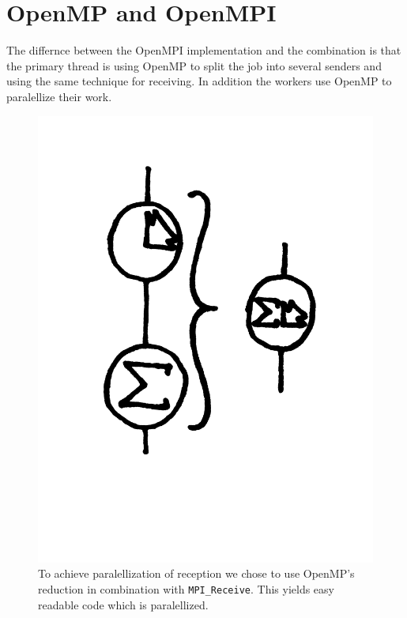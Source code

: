 \section{OpenMP and OpenMPI }
The differnce between the OpenMPI implementation and the combination is that the primary thread is using OpenMP to split the job into several senders and using the same technique for receiving. 
In addition the workers use OpenMP to paralellize their work. 


\begin{figure}
\caption{To achieve paralellization of reception we chose to use OpenMP's reduction in combination with {\tt MPI\_Receive}. This yields easy readable code which is paralellized. }
\includegraphics[width=\textwidth]{flyt2}
\end{figure}

